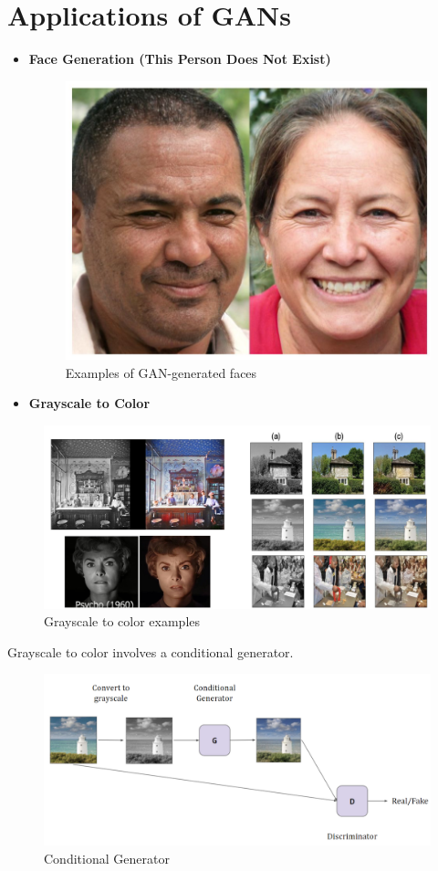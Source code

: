 \section{Applications of GANs}

\begin{itemize}
    \item \textbf{Face Generation (This Person Does Not Exist)}

\begin{figure}[h!t]
    \centering
    \includegraphics[width=0.1\linewidth]{facegen.png}
    \caption{Examples of GAN-generated faces}
    \label{fig:enter-label}
\end{figure}

    \item \textbf{Grayscale to Color}
\end{itemize}

\begin{figure}[h!t]
    \centering
    \includegraphics[width=0.35\linewidth]{grayscaletocolor.png}
    \caption{Grayscale to color examples}
    \label{fig:enter-label}
\end{figure}


\begin{idea}
    Grayscale to color involves a conditional generator.
\end{idea}

\begin{figure}
    \centering
    \includegraphics[width=0.75\linewidth]{condgen.png}
    \caption{Conditional Generator}
    \label{fig:enter-label}
\end{figure}

\newpage


